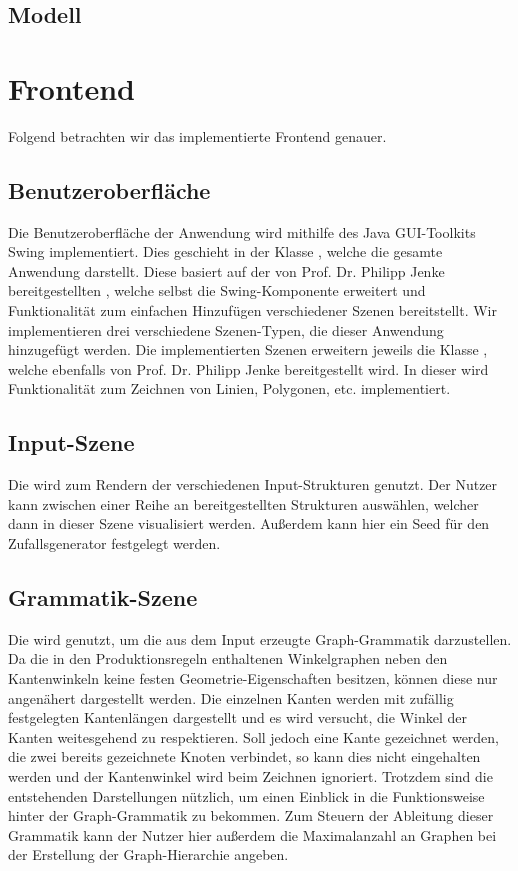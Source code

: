 \subsection{Modell}

\section{Frontend}
Folgend betrachten wir das implementierte Frontend genauer.

\subsection{Benutzeroberfläche}
Die Benutzeroberfläche der Anwendung wird mithilfe des Java GUI-Toolkits Swing implementiert. Dies geschieht in der Klasse
, welche die gesamte Anwendung darstellt. Diese basiert auf der von Prof. Dr. Philipp Jenke bereitgestellten
, welche selbst die Swing-Komponente  erweitert und
Funktionalität zum einfachen Hinzufügen verschiedener Szenen bereitstellt. Wir implementieren drei verschiedene Szenen-Typen,
die dieser Anwendung hinzugefügt werden. Die implementierten Szenen erweitern jeweils die Klasse , welche ebenfalls
von Prof. Dr. Philipp Jenke bereitgestellt wird. In dieser wird Funktionalität zum Zeichnen von Linien, Polygonen, etc. implementiert.

\subsection{Input-Szene}
Die  wird zum Rendern der verschiedenen Input-Strukturen genutzt. Der Nutzer kann zwischen
einer Reihe an bereitgestellten Strukturen auswählen, welcher dann in dieser Szene visualisiert werden. Außerdem kann hier ein
Seed für den Zufallsgenerator festgelegt werden.

\subsection{Grammatik-Szene}
Die  wird genutzt, um die aus dem Input erzeugte Graph-Grammatik darzustellen. Da die in den
Produktionsregeln enthaltenen Winkelgraphen neben den Kantenwinkeln keine festen Geometrie-Eigenschaften besitzen, können diese nur
angenähert dargestellt werden. Die einzelnen Kanten werden mit zufällig festgelegten Kantenlängen dargestellt und es wird versucht, die
Winkel der Kanten weitesgehend zu respektieren. Soll jedoch eine Kante gezeichnet werden, die zwei bereits gezeichnete Knoten verbindet,
so kann dies nicht eingehalten werden und der Kantenwinkel wird beim Zeichnen ignoriert. Trotzdem sind die entstehenden Darstellungen
nützlich, um einen Einblick in die Funktionsweise hinter der Graph-Grammatik zu bekommen. Zum Steuern der Ableitung dieser Grammatik
kann der Nutzer hier außerdem die Maximalanzahl an Graphen bei der Erstellung der Graph-Hierarchie angeben.


